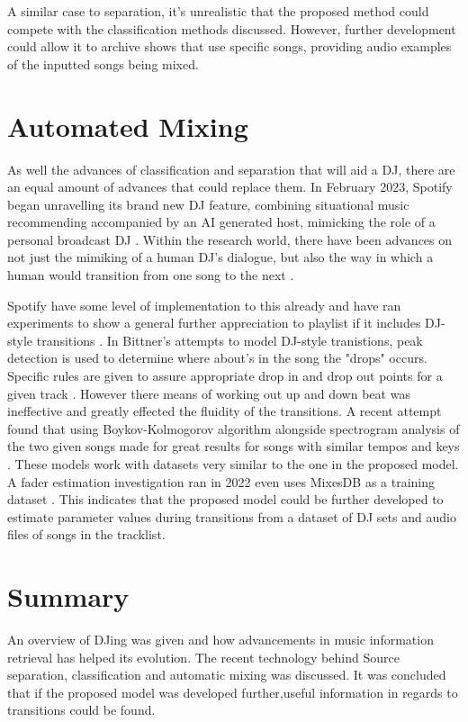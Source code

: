 A similar case to separation, it's unrealistic that the proposed method could compete with the classification methods discussed. However, further development could allow it to archive shows that use specific songs, providing audio examples of the inputted songs being mixed.

\section{Automated Mixing}
As well the advances of classification and separation that will aid a DJ, there are an equal amount of advances that could replace them. In February 2023, Spotify began unravelling its brand new DJ feature, combining situational music recommending accompanied by an AI generated host, mimicking the role of a personal broadcast DJ \citep{naomi_spotify_2023}. Within the research world, there have been advances on not just the mimiking of a human DJ's dialogue, but also the way in which a human would transition from one song to the next \citep{chen_automatic_2022}.

Spotify have some level of implementation to this already and have ran experiments to show a general further appreciation to playlist if it includes DJ-style transitions \citep{bittner_automatic_2017}. In Bittner's  attempts to model DJ-style tranistions, peak detection is used to determine where about's in the song the "drops" occurs. Specific rules are given to assure appropriate drop in and drop out points for a given track \citep{bittner_automatic_2017}.  However there means of working out up and down beat was ineffective and greatly effected the fluidity of the transitions. A recent attempt found that using Boykov-Kolmogorov algorithm alongside spectrogram analysis of the two given songs made for great results for songs with similar tempos and keys \citep{robinson_automated_2023}. These models work with datasets very similar to the one in the proposed model. A fader estimation investigation ran in 2022 even uses MixesDB as a training dataset \citep{kim_joint_2022}. This indicates that the proposed model could be further developed to estimate parameter values during transitions from a dataset of DJ sets and audio files of songs in the tracklist.

\section{Summary}
An overview of DJing was given and how advancements in music information retrieval has helped its evolution. The recent technology behind Source separation, classification and automatic mixing was discussed. It was concluded that if the proposed model was developed further,useful information in regards to transitions could be found.

